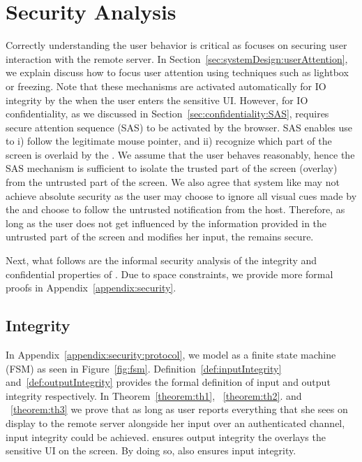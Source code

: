 \section{Security Analysis}
\label{sec:securityAnalysis}



 Correctly understanding the user behavior is critical as \name focuses on securing user interaction with the remote server. In Section~\ref{sec:systemDesign:userAttention}, we explain discuss how to focus user attention using techniques such as lightbox or freezing. Note that these mechanisms are activated automatically for IO integrity by the \device when the user enters the sensitive UI. However, for IO confidentiality, as we discussed in Section~\ref{sec:confidentiality:SAS}, \name requires secure attention sequence (SAS) to be activated by the browser. SAS enables use to i) follow the legitimate mouse pointer, and ii) recognize which part of the screen is overlaid by the \device. We assume that the user behaves reasonably, hence the SAS mechanism is sufficient to isolate the trusted part of the screen (\device overlay) from the untrusted part of the screen. We also agree that system like \name may not achieve absolute security as the user may choose to ignore all visual cues made by the \device and choose to follow the untrusted notification from the host. Therefore, as long as the user does not get influenced by the information provided in the untrusted part of the screen and modifies her input, the \name remains secure.


Next, what follows are the informal security analysis of the integrity and confidential properties of \name. Due to space constraints, we provide more formal proofs in Appendix~\ref{appendix:security}.


\subsection{Integrity}
\label{sec:securityAnalysis:integrity}

 In Appendix~\ref{appendix:security:protocol}, we model \name as a finite state machine (FSM) as seen in Figure~\ref{fig:fsm}. Definition~\ref{def:inputIntegrity} and~\ref{def:outputIntegrity} provides the formal definition of input and output integrity respectively. In Theorem~\ref{theorem:th1}, ~\ref{theorem:th2}. and ~\ref{theorem:th3} we prove that as long as user reports everything that she sees on display to the remote server alongside her input over an authenticated channel, input integrity could be achieved. \name ensures output integrity the \device overlays the sensitive UI on the screen. By doing so, \name also ensures input integrity. 

